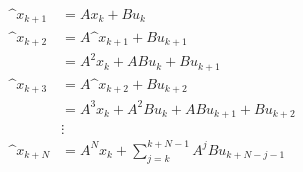 \begin{equation}
\begin{split}
\^{x_{k+1}} &= Ax_k + Bu_k\\
\^{x_{k+2}} &= A\^{x_{k+1}} + Bu_{k+1}\\
&= A^2x_k + ABu_k + Bu_{k+1}\\
\^{x_{k+3}} &= A\^{x_{k+2}} + Bu_{k+2}\\
&= A^3x_k + A^2Bu_k + ABu_{k+1} + Bu_{k+2}\\
&\vdots\\
\^{x_{k+N}} &= A^Nx_k+\sum_{j=k}^{k+N-1}A^jBu_{k+N-j-1}
\end{split}
\end{equation}
